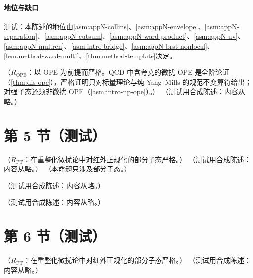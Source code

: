 \paragraph{地位与缺口}测试：本陈述的地位由\cref{asm:appN-collins}、\cref{asm:appN-envelope}、\cref{asm:appN-separation}、\cref{asm:appN-cutsum}、\cref{asm:appN-ward-product}、\cref{asm:appN-uv}、\cref{asm:appN-multren}、\cref{asm:intro-bridge}、\cref{asm:appN-brst-nonlocal}、\cref{lem:method-ward-multi}、\cref{thm:method-template}决定。

\begin{corollary}\label{cor:disall-consistency}
（$R_{\mathrm{OPE}}$：以 OPE 为前提而严格。QCD 中含夸克的微扰 OPE 是全阶论证（\cref{thm:dis-ope}），严格证明只对标量理论与纯 Yang--Mills 的规范不变算符给出；对强子态还须非微扰 OPE（\cref{asm:intro-np-ope}）。）
（测试用合成陈述：内容从略。）
\end{corollary}

\section{第 5 节（测试）}\label{sec:disall-consistency}

\begin{proposition}\label{prop:disall-nlo}
（$R_{\mathrm{PT}}$：在重整化微扰论中对红外正规化的部分子态严格。）
（测试用合成陈述：内容从略。）
（本命题只涉及部分子态。）
\end{proposition}

\begin{example}\label{ex:disall-nlo}
（测试用合成陈述：内容从略。）
\end{example}

\begin{example}[光子—胶子融合]\label{ex:disall-gluon}
（测试用合成陈述：内容从略。）
\end{example}

\section{第 6 节（测试）}\label{sec:disall-nlo}

\begin{proposition}\label{prop:disall-scale}
（$R_{\mathrm{PT}}$：在重整化微扰论中对红外正规化的部分子态严格。）
（测试用合成陈述：内容从略。）
\end{proposition}

